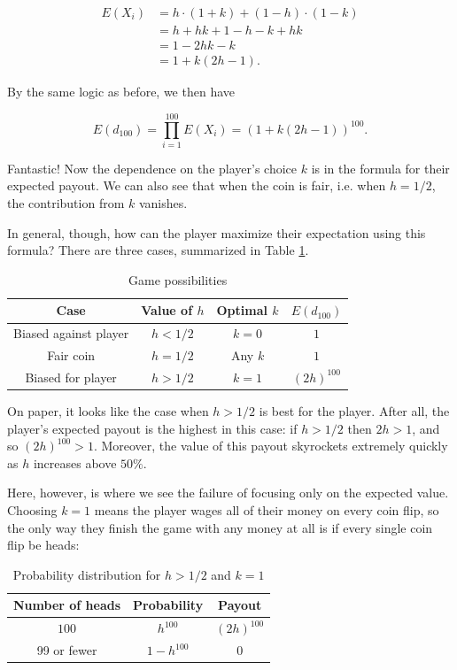 \documentclass[12pt, oneside]{book}
\theoremstyle{plain}
\theoremstyle{definition}
\begin{document}
\begin{align*}
E(X_i) & = h \cdot (1+k) + (1-h) \cdot (1-k)\\
& = h+hk+1-h-k+hk\\
& = 1-2hk-k\\
& = 1+k(2h-1).
\end{align*}

\noindent By the same logic as before, we then have

\begin{equation}\label{eqn:expect2}
E(d_{100}) = \prod_{i=1}^{100} E(X_i) = (1+k(2h-1))^{100}.
\end{equation}

Fantastic! Now the dependence on the player's choice $k$ is in the formula for their expected payout. We can also see that when the coin is fair, i.e. when $h=1/2$, the contribution from $k$ vanishes.

In general, though, how can the player maximize their expectation using this formula? There are three cases, summarized in Table \ref{table:possibilities}.

\begin{table}[!h]
\caption{Game possibilities}
\centering
\begin{tabular}{c | c | c | c}
\hline \hline
Case & Value of $h$ & Optimal $k$ & $E(d_{100})$\\
\hline
Biased against player & $h<1/2$ & $k=0$ & $1$ \\
Fair coin & $h=1/2$ & Any $k$ & $1$ \\
Biased for player & $h>1/2$ & $k=1$ & $(2h)^{100}$\\
\hline
\end{tabular}
\label{table:possibilities}
\end{table}

On paper, it looks like the case when $h>1/2$ is best for the player. After all, the player's expected payout is the highest in this case: if $h>1/2$ then $2h >1$, and so $(2h)^{100}>1$. Moreover, the value of this payout skyrockets extremely quickly as $h$ increases above $50\%$.

Here, however, is where we see the failure of focusing only on the expected value. Choosing $k=1$ means the player wages all of their money on every coin flip, so the only way they finish the game with any money at all is if every single coin flip be heads:

\begin{table}[!h]
\caption{Probability distribution for $h>1/2$ and $k=1$}
\centering
\begin{tabular}{c | c | c}
\hline \hline
Number of heads & Probability & Payout\\
\hline
$100$ & $h^{100}$ & $(2h)^{100}$ \\
99 or fewer & $1-h^{100}$ & $0$\\
\hline
\end{tabular}
\label{table:probdist1}
\end{table}
\end{document}
